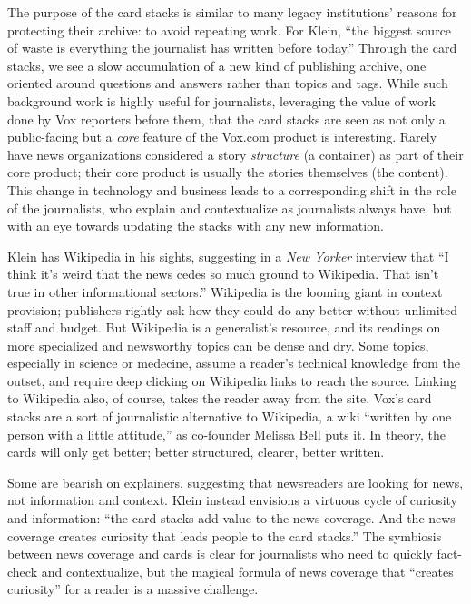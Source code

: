 The purpose of the card stacks is similar to many legacy institutions' reasons for protecting their archive: to avoid repeating work. For Klein, ``the biggest source of waste is everything the journalist has written before today.''\autocite{} Through the card stacks, we see a slow accumulation of a new kind of publishing archive, one oriented around questions and answers rather than topics and tags. While such background work is highly useful for journalists, leveraging the value of work done by Vox reporters before them, that the card stacks are seen as not only a public-facing but a \emph{core} feature of the Vox.com product is interesting. Rarely have news organizations considered a story \emph{structure} (a container) as part of their core product; their core product is usually the stories themselves (the content). This change in technology and business leads to a corresponding shift in the role of the journalists, who explain and contextualize as journalists always have, but with an eye towards updating the stacks with any new information. 

Klein has Wikipedia in his sights, suggesting in a \emph{New Yorker} interview that ``I think it's weird that the news cedes so much ground to Wikipedia. That isn't true in other informational sectors.''\autocite{} Wikipedia is the looming giant in context provision; publishers rightly ask how they could do any better without unlimited staff and budget. But Wikipedia is a generalist's resource, and its readings on more specialized and newsworthy topics can be dense and dry. Some topics, especially in science or medecine, assume a reader's technical knowledge from the outset, and require deep clicking on Wikipedia links to reach the source. Linking to Wikipedia also, of course, takes the reader away from the site. Vox's card stacks are a sort of journalistic alternative to Wikipedia, a wiki ``written by one person with a little attitude,'' as co-founder Melissa Bell puts it.\autocite{} In theory, the cards will only get better; better structured, clearer, better written.

Some are bearish on explainers, suggesting that newsreaders are looking for news, not information and context. Klein instead envisions a virtuous cycle of curiosity and information: ``the card stacks add value to the news coverage. And the news coverage creates curiosity that leads people to the card stacks.''\autocite{} The symbiosis between news coverage and cards is clear for journalists who need to quickly fact-check and contextualize, but the magical formula of news coverage that ``creates curiosity'' for a reader is a massive challenge.

